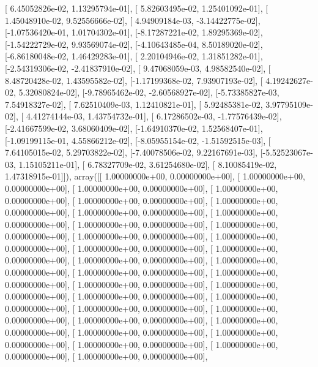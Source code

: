 \documentclass{article}
\begin{document}
       [ 6.45052826e-02,  1.13295794e-01],
       [ 5.82603495e-02,  1.25401092e-01],
       [ 1.45048910e-02,  9.52556666e-02],
       [ 4.94909184e-03, -3.14422775e-02],
       [-1.07536420e-01,  1.01704302e-01],
       [-8.17287221e-02,  1.89295369e-02],
       [-1.54222729e-02,  9.93569074e-02],
       [-4.10643485e-04,  8.50189020e-02],
       [-6.86180048e-02,  1.46429283e-01],
       [ 2.20104946e-02,  1.31851282e-01],
       [-2.54319306e-02, -2.41837910e-02],
       [ 9.47068059e-03,  4.98582540e-02],
       [ 8.48720428e-02,  1.43595582e-02],
       [-1.17199368e-02,  7.93907193e-02],
       [ 4.19242627e-02,  5.32080824e-02],
       [-9.78965462e-02, -2.60568927e-02],
       [-5.73385827e-03,  7.54918327e-02],
       [ 7.62510409e-03,  1.12410821e-01],
       [ 5.92485381e-02,  3.97795109e-02],
       [ 4.41274144e-03,  1.43754732e-01],
       [ 6.17286502e-03, -1.77576439e-02],
       [-2.41667599e-02,  3.68060409e-02],
       [-1.64910370e-02,  1.52568407e-01],
       [-1.09199115e-01,  4.55866212e-02],
       [-8.05955154e-02, -1.51592515e-03],
       [ 7.64105015e-02,  5.29703822e-02],
       [-7.40078506e-02,  9.22167691e-03],
       [-5.52523067e-03,  1.15105211e-01],
       [ 6.78327709e-02,  3.61254680e-02],
       [ 8.10085419e-02,  1.47318915e-01]]), array([[ 1.00000000e+00,  0.00000000e+00],
       [ 1.00000000e+00,  0.00000000e+00],
       [ 1.00000000e+00,  0.00000000e+00],
       [ 1.00000000e+00,  0.00000000e+00],
       [ 1.00000000e+00,  0.00000000e+00],
       [ 1.00000000e+00,  0.00000000e+00],
       [ 1.00000000e+00,  0.00000000e+00],
       [ 1.00000000e+00,  0.00000000e+00],
       [ 1.00000000e+00,  0.00000000e+00],
       [ 1.00000000e+00,  0.00000000e+00],
       [ 1.00000000e+00,  0.00000000e+00],
       [ 1.00000000e+00,  0.00000000e+00],
       [ 1.00000000e+00,  0.00000000e+00],
       [ 1.00000000e+00,  0.00000000e+00],
       [ 1.00000000e+00,  0.00000000e+00],
       [ 1.00000000e+00,  0.00000000e+00],
       [ 1.00000000e+00,  0.00000000e+00],
       [ 1.00000000e+00,  0.00000000e+00],
       [ 1.00000000e+00,  0.00000000e+00],
       [ 1.00000000e+00,  0.00000000e+00],
       [ 1.00000000e+00,  0.00000000e+00],
       [ 1.00000000e+00,  0.00000000e+00],
       [ 1.00000000e+00,  0.00000000e+00],
       [ 1.00000000e+00,  0.00000000e+00],
       [ 1.00000000e+00,  0.00000000e+00],
       [ 1.00000000e+00,  0.00000000e+00],
       [ 1.00000000e+00,  0.00000000e+00],
       [ 1.00000000e+00,  0.00000000e+00],
       [ 1.00000000e+00,  0.00000000e+00],
       [ 1.00000000e+00,  0.00000000e+00],
       [ 1.00000000e+00,  0.00000000e+00],
\end{document}
